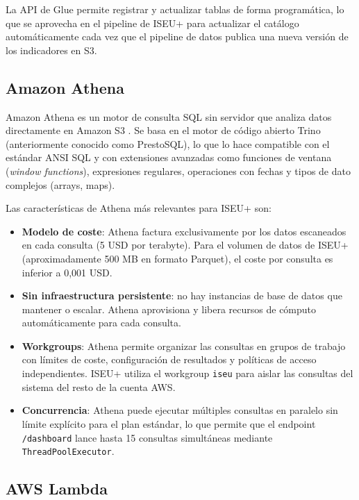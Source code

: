 La API de Glue permite registrar y actualizar tablas de forma programática, lo que se aprovecha en el pipeline de ISEU+ para actualizar el catálogo automáticamente cada vez que el pipeline de datos publica una nueva versión de los indicadores en S3.

\subsection{Amazon Athena}

Amazon Athena es un motor de consulta SQL sin servidor que analiza datos directamente en Amazon S3 \parencite{AWS2023Athena}. Se basa en el motor de código abierto Trino (anteriormente conocido como PrestoSQL), lo que lo hace compatible con el estándar ANSI SQL y con extensiones avanzadas como funciones de ventana (\textit{window functions}), expresiones regulares, operaciones con fechas y tipos de dato complejos (arrays, maps).

Las características de Athena más relevantes para ISEU+ son:

\begin{itemize}
  \item \textbf{Modelo de coste}: Athena factura exclusivamente por los datos escaneados en cada consulta (5 USD por terabyte). Para el volumen de datos de ISEU+ (aproximadamente 500 MB en formato Parquet), el coste por consulta es inferior a 0{,}001 USD.
  \item \textbf{Sin infraestructura persistente}: no hay instancias de base de datos que mantener o escalar. Athena aprovisiona y libera recursos de cómputo automáticamente para cada consulta.
  \item \textbf{Workgroups}: Athena permite organizar las consultas en grupos de trabajo con límites de coste, configuración de resultados y políticas de acceso independientes. ISEU+ utiliza el workgroup \texttt{iseu} para aislar las consultas del sistema del resto de la cuenta AWS.
  \item \textbf{Concurrencia}: Athena puede ejecutar múltiples consultas en paralelo sin límite explícito para el plan estándar, lo que permite que el endpoint \texttt{/dashboard} lance hasta 15 consultas simultáneas mediante \texttt{ThreadPoolExecutor}.
\end{itemize}

\subsection{AWS Lambda}


